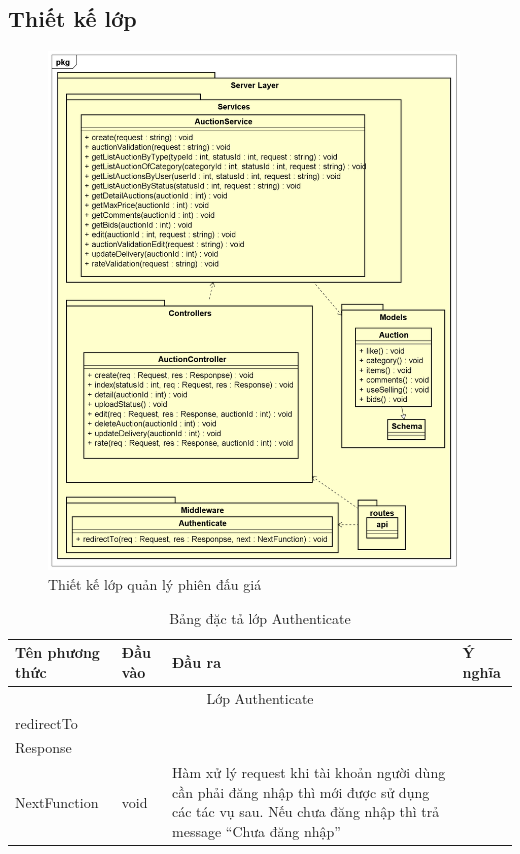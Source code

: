 \documentclass[../DoAn.tex]{subfiles}
\begin{document}
\subsection{Thiết kế lớp}
\begin{figure}[H]
    \centering
    \includegraphics[width=0.75\linewidth,height=13.74cm]{Hinhve/Thiết kế chi tiết75.png}
    \caption{Thiết kế lớp quản lý phiên đấu giá}%
    \label{fig:Fig412}
\end{figure}

    \begin{longtable}{| p{} | p{} | p{} | p{} |}
    \caption{Bảng đặc tả lớp Authenticate}
    \label{bang43}
    \endfirsthead
    \endhead
    \hline
        \bfseries Tên phương thức & \bfseries Đầu vào & \bfseries Đầu ra & \bfseries Ý nghĩa\\\hline
        \multicolumn{4}{|c|}{Lớp Authenticate}\\\hline
        redirectTo & {%
            \begin{tabular}{l}
                 Request\\
                 Response\\
                 NextFunction
            \end{tabular}
        } & void &  Hàm xử lý request khi tài khoản người dùng cần phải đăng nhập thì mới được sử dụng các tác vụ sau. Nếu chưa đăng nhập thì trả message “Chưa đăng nhập”\\\hline
    \end{longtable}\\
\end{document}
